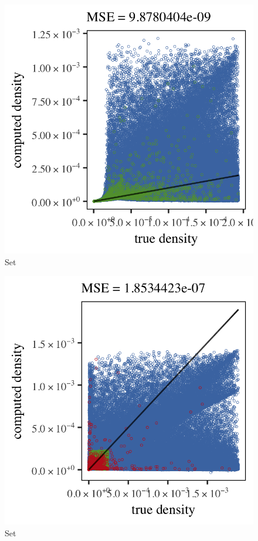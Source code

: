 
\begin{subfigure}{0.3\textwidth}
	\centering
	\includegraphics[keepaspectratio=true, width=\textwidth, height=0.23\textheight]{4/img/results_ferdosi_1_600000_sambe_breiman}
	\caption{Set \ferdosiOne}
	\label{fig:4:simulated:datasets:sambe:ferdosi1}
\end{subfigure}
\begin{subfigure}{0.3\textwidth}
	\centering
	\includegraphics[keepaspectratio=true, width=\textwidth, height=0.23\textheight]{4/img/results_ferdosi_2_600000_sambe_breiman}
	\caption{Set \ferdosiTwo}
	\label{fig:4:simulated:datasets:sambe:ferdosi2}
\end{subfigure}	
